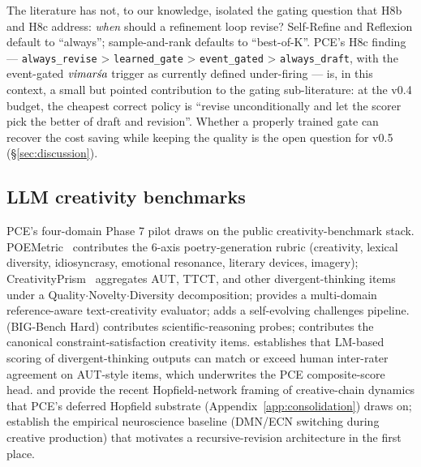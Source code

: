 The literature has not, to our knowledge, isolated the gating question that H8b and H8c address: \emph{when} should a refinement loop revise? Self-Refine and Reflexion default to ``always''; sample-and-rank defaults to ``best-of-K''. PCE's H8c finding --- \texttt{always\_revise} > \texttt{learned\_gate} > \texttt{event\_gated} > \texttt{always\_draft}, with the event-gated $\textit{vimar\'sa}$ trigger as currently defined under-firing --- is, in this context, a small but pointed contribution to the gating sub-literature: at the v0.4 budget, the cheapest correct policy is ``revise unconditionally and let the scorer pick the better of draft and revision''. Whether a properly trained  gate can recover the cost saving while keeping the quality is the open question for v0.5 (\S\ref{sec:discussion}).

\subsection{LLM creativity benchmarks}

PCE's four-domain Phase 7 pilot draws on the public creativity-benchmark stack. POEMetric~\citep{Ye2025POEMetric,li2026poemetric} contributes the 6-axis poetry-generation rubric (creativity, lexical diversity, idiosyncrasy, emotional resonance, literary devices, imagery); CreativityPrism~\citep{CreativityPrism2025,hou2025creativityprism} aggregates AUT, TTCT, and other divergent-thinking items under a Quality$\cdot$Novelty$\cdot$Diversity decomposition; \citet{cao2025creval} provides a multi-domain reference-aware text-creativity evaluator; \citet{wang2026creativebench} adds a self-evolving challenges pipeline. \citet{suzgun2023bbh} (BIG-Bench Hard) contributes scientific-reasoning probes; \citet{Tian2024MacGyver} contributes the canonical constraint-satisfaction creativity items. \citet{organisciak2023aut} establishes that LM-based scoring of divergent-thinking outputs can match or exceed human inter-rater agreement on AUT-style items, which underwrites the PCE composite-score head. \citet{Mtenga2024HopfieldCreativity} and \citet{Weber2025SelfOptHopfield} provide the recent Hopfield-network framing of creative-chain dynamics that PCE's deferred Hopfield  substrate (Appendix~\ref{app:consolidation}) draws on; \citet{Beaty2015SciRepDMNECN,ChenKenett2025CommunBiolDynamics} establish the empirical neuroscience baseline (DMN/ECN switching during creative production) that motivates a recursive-revision architecture in the first place.

